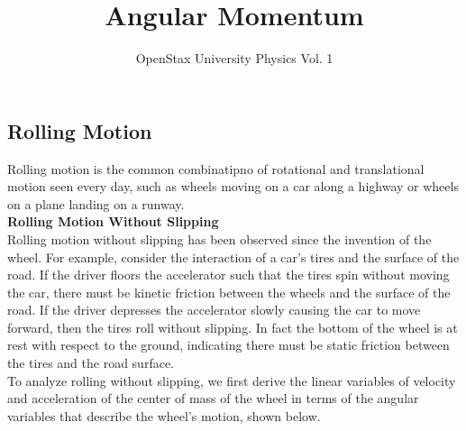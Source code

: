\documentclass[a4paper]{article}
\title{Angular Momentum}
\author{OpenStax University Physics Vol. 1}
\date{}
\let\bf\textbf
\begin{document}
\setcounter{section}{11}
\maketitle
\subsection{Rolling Motion}
Rolling motion is the common combinatipno of rotational and translational motion seen every day, such as wheels moving on a car along a highway or wheels on a plane landing on a runway.\vspace{2mm}\\
\bf{Rolling Motion Without Slipping}\vspace{2mm}\\
Rolling motion without slipping has been observed since the invention of the wheel. For example, consider the interaction of a car's tires and the surface of the road. If the driver floors the accelerator such that the tires spin without moving the car, there must be kinetic friction between the wheels and the surface of the road. If the driver depresses the accelerator slowly causing the car to move forward, then the tires roll without slipping. In fact the bottom of the wheel is at rest with respect to the ground, indicating there must be static friction between the tires and the road surface.\vspace{1mm}\\
To analyze rolling without slipping, we first derive the linear variables of velocity and acceleration of the center of mass of the wheel in terms of the angular variables that describe the wheel's motion, shown below.
\end{document}
